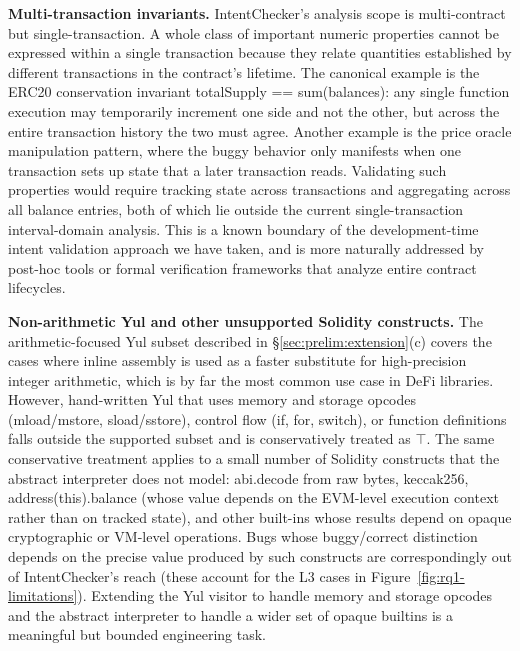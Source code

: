 \documentclass[pdflatex,sn-basic]{sn-jnl}%
\theoremstyle{thmstyleone}%
\theoremstyle{thmstyletwo}%
\theoremstyle{thmstylethree}%
\begin{document}
\smallskip
\noindent\textbf{Multi-transaction invariants.}
IntentChecker's analysis scope is multi-contract but single-transaction.
A whole class of important numeric properties cannot be expressed within a single transaction because they relate quantities established by different transactions in the contract's lifetime.
The canonical example is the ERC20 conservation invariant totalSupply == sum(balances): any single function execution may temporarily increment one side and not the other, but across the entire transaction history the two must agree.
Another example is the price oracle manipulation pattern, where the buggy behavior only manifests when one transaction sets up state that a later transaction reads.
Validating such properties would require tracking state across transactions and aggregating across all balance entries, both of which lie outside the current single-transaction interval-domain analysis.
This is a known boundary of the development-time intent validation approach we have taken, and is more naturally addressed by post-hoc tools or formal verification frameworks that analyze entire contract lifecycles.

\smallskip
\noindent\textbf{Non-arithmetic Yul and other unsupported Solidity constructs.}
The arithmetic-focused Yul subset described in §\ref{sec:prelim:extension}(c) covers the cases where inline assembly is used as a faster substitute for high-precision integer arithmetic, which is by far the most common use case in DeFi libraries.
However, hand-written Yul that uses memory and storage opcodes (mload/mstore, sload/sstore), control flow (if, for, switch), or function definitions falls outside the supported subset and is conservatively treated as $\top$.
The same conservative treatment applies to a small number of Solidity constructs that the abstract interpreter does not model: abi.decode from raw bytes, keccak256, address(this).balance (whose value depends on the EVM-level execution context rather than on tracked state), and other built-ins whose results depend on opaque cryptographic or VM-level operations.
Bugs whose buggy/correct distinction depends on the precise value produced by such constructs are correspondingly out of IntentChecker's reach (these account for the L3 cases in Figure~\ref{fig:rq1-limitations}).
Extending the Yul visitor to handle memory and storage opcodes and the abstract interpreter to handle a wider set of opaque builtins is a meaningful but bounded engineering task.
\end{document}
